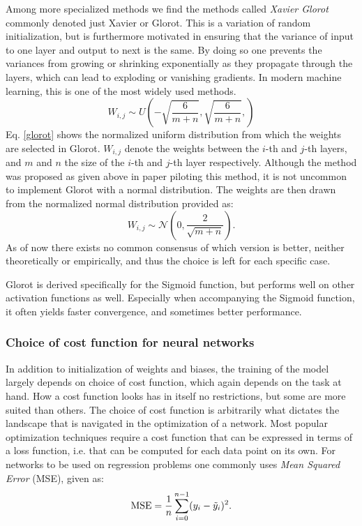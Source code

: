 Among more specialized methods we find the methods called \textit{Xavier Glorot} \cite{Glorot} commonly denoted just Xavier or Glorot. This is a variation of random initialization, but is furthermore motivated in ensuring that the variance of input to one layer and output to next is the same. By doing so one prevents the variances from growing or shrinking exponentially as they propagate through the layers, which can lead to exploding or vanishing gradients. In modern machine learning, this is one of the most widely used methods.
\begin{equation}\label{glorot}
    W_{i,j} \sim U\left(-\sqrt{\frac{6}{m+n}},{\sqrt{\frac{6}{m+n}}},\right)
\end{equation}
Eq. \ref{glorot} shows the normalized uniform distribution from which the weights are selected in Glorot. $W_{i,j}$ denote the weights between the $i$-th and $j$-th layers, and $m$ and $n$ the size of the $i$-th and $j$-th layer respectively. Although the method was proposed as given above in paper piloting this method, it is not uncommon to implement Glorot with a normal distribution. The weights are then drawn from the normalized normal distribution provided as:
\begin{equation}
    W_{i,j} \sim \mathcal{N}\left(0, \frac{2}{\sqrt{m+n}}\right).
\end{equation}
As of now there exists no common consensus of which version is better, neither theoretically or empirically, and thus the choice is left for each specific case.

Glorot is derived specifically for the Sigmoid function, but performs well on other activation functions as well. Especially when accompanying the Sigmoid function, it often yields faster convergence, and sometimes better performance.

\subsubsection{Choice of cost function for neural networks}
In addition to initialization of weights and biases, the training of the model largely depends on choice of cost function, which again depends on the task at hand. How a cost function looks has in itself no restrictions, but some are more suited than others.
The choice of cost function is arbitrarily what dictates the landscape that is navigated in the optimization of a network. Most popular optimization techniques require a cost function that can be expressed in terms of a loss function, i.e. that can be computed for each data point on its own. 
For networks to be used on regression problems one commonly uses \textit{Mean Squared Error} (MSE), given as: 
\begin{equation}\label{mse}
    \text{MSE} = \frac{1}{n}\sum_{i=0}^{n-1}(y_i-\Tilde{y}_i)^2.
\end{equation}

